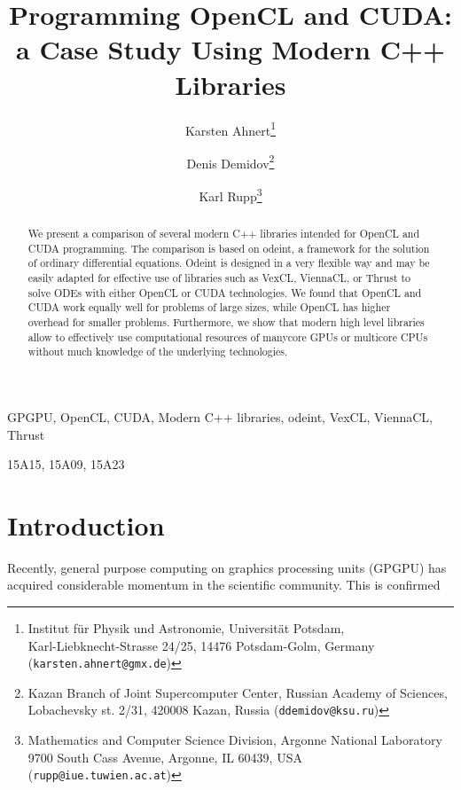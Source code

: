 \documentclass[final]{siamltex}
\title{Programming OpenCL and CUDA:\\a Case Study Using Modern C++ Libraries}
\author{
Karsten Ahnert\thanks{
Institut f\"ur Physik und Astronomie, Universit\"at Potsdam,\\
Karl-Liebknecht-Strasse 24/25, 14476 Potsdam-Golm, Germany
({\tt karsten.ahnert@gmx.de})
}
\and
Denis Demidov\thanks{
Kazan Branch of Joint Supercomputer Center,
Russian Academy of Sciences,\\
Lobachevsky st. 2/31, 420008 Kazan, Russia
({\tt ddemidov@ksu.ru})
}
\and
Karl Rupp\thanks{Mathematics and Computer Science Division,
Argonne National Laboratory \\
9700 South Cass Avenue, Argonne, IL 60439, USA
({\tt rupp@iue.tuwien.ac.at})
}
}
\begin{document}
\maketitle

\begin{abstract}
    We present a comparison of several modern C++ libraries intended for OpenCL
    and CUDA programming. The comparison is based on odeint, a framework for
    the solution of ordinary differential equations. Odeint is designed in a
    very flexible way and may be easily adapted for effective use of libraries such
    as VexCL, ViennaCL, or Thrust to solve ODEs with either OpenCL or CUDA
    technologies. We found that OpenCL and CUDA work equally well for problems
    of large sizes, while OpenCL has higher overhead for smaller problems.
    Furthermore, we show that modern high level libraries allow to effectively
    use computational resources of manycore GPUs or multicore CPUs without much
    knowledge of the underlying technologies.
\end{abstract}

\begin{keywords}
    GPGPU, OpenCL, CUDA, Modern C++ libraries, odeint, VexCL, ViennaCL, Thrust
\end{keywords}

\begin{AMS}
15A15, 15A09, 15A23
\end{AMS}

\pagestyle{myheadings}
\thispagestyle{plain}



%
%
\section{Introduction}

Recently, general purpose computing on graphics processing units (GPGPU) has
acquired considerable momentum in the scientific community. This is confirmed
\end{document}
